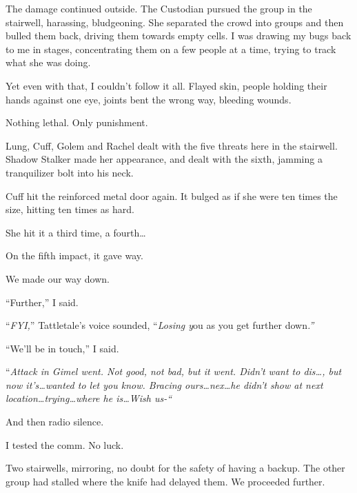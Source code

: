 The damage continued outside.  The Custodian pursued the group in the stairwell, harassing, bludgeoning.  She separated the crowd into groups and then bulled them back, driving them towards empty cells.  I was drawing my bugs back to me in stages, concentrating them on a few people at a time, trying to track what she was doing.



Yet even with that, I couldn't follow it all.  Flayed skin, people holding their hands against one eye, joints bent the wrong way, bleeding wounds.



Nothing lethal.  Only punishment.



Lung, Cuff, Golem and Rachel dealt with the five threats here in the stairwell.  Shadow Stalker made her appearance, and dealt with the sixth, jamming a tranquilizer bolt into his neck.



Cuff hit the reinforced metal door again.  It bulged as if she were ten times the size, hitting ten times as hard.



She hit it a third time, a fourth\ldots



On the fifth impact, it gave way.



We made our way down.



``Further,'' I said.



``\emph{FYI,}'' Tattletale's voice sounded, ``\emph{Losing y}ou as you get further down\emph{.''}



``We'll be in touch,'' I said.



``\emph{Attack in Gimel went.  Not good, not bad, but it went.  Didn't want to dis\ldots, but now it's\ldots    \ldotsJust wanted to let you know.  Bracing ours\ldots \ldotsr nex\ldots he didn't show at next location\ldots trying\ldots  where he is\ldots Wish us-``}



And then radio silence.



I tested the comm.  No luck.



Two stairwells, mirroring, no doubt for the safety of having a backup.  The other group had stalled where the knife had delayed them.  We proceeded further.



